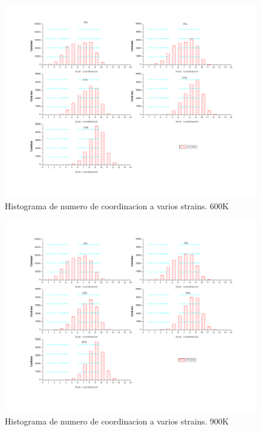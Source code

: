 \documentclass[10pt, oneside]{article} %
\begin{document}
\begin{figure}[H]
\centering
\includegraphics[width=16cm]{Figures/600-HistogramaCoord_COMP.png}
\caption{Histograma de numero de coordinacion a varios strains. 600K}
\end{figure}

\begin{figure}[H]
\centering
\includegraphics[width=16cm]{Figures/900-HistogramaCoord_COMP.png}
\caption{Histograma de numero de coordinacion a varios strains. 900K}
\end{figure}
\end{document}

